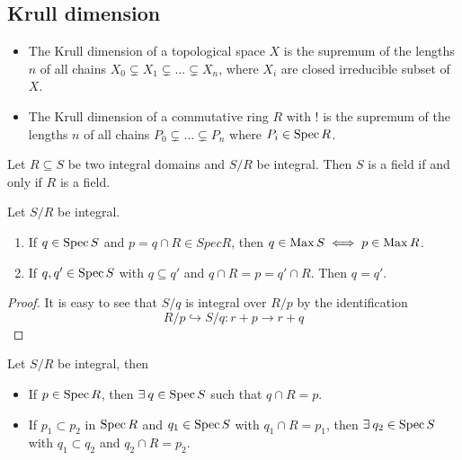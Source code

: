 \subsection{Krull dimension}
\begin{definition} \hfill
  \begin{itemize}
    \item 
      The Krull dimension of a topological space $X$ is the supremum of the lengths $n$ of
      all chains $X_0 \subsetneq X_1 \subsetneq \dots \subsetneq X_n$, where $X_i$ are closed irreducible subset of $X$.
    \item
      The Krull dimension of a commutative ring $R$ with $!$ is the
      supremum of the lengths $n$ of all chains $P_0 \subsetneq \dots \subsetneq P_n$ where $P_i \in \operatorname{Spec} R$.
  \end{itemize}
\end{definition}

\begin{prop}
  Let $R \subseteq S$ be two integral domains and $S/R$ be integral. Then $S$ is a field if and only if $R$ is a field.
\end{prop}

\begin{prop}
  Let $S/R$ be integral.
  \begin{enumerate}
    \item If $q \in \operatorname{Spec} S$ and $p = q \cap R \in Spec R$, then
      $q \in \operatorname{Max} S \iff p \in \operatorname{Max} R$.
    \item If $q, q' \in \operatorname{Spec} S$ with $q \subseteq q'$ and $q \cap R = p = q' \cap R$.
      Then $q = q'$.
  \end{enumerate}

  \begin{proof}
    It is easy to see that $S/q$ is integral over $R/p$ by the identification
    \[ R/p \hookrightarrow S/q : r+p \to r+q\]
  \end{proof}
\end{prop}

\begin{theorem}
  Let $S/R$ be integral, then
  \begin{itemize}
    \item If $p \in \operatorname{Spec} R$, then $\exists q \in \Spec S$ such that $q \cap R = p$.
    \item If $p_1 \subset p_2$ in $\operatorname{Spec} R$ and $q_1 \in \operatorname{Spec} S$ with $q_1 \cap R = p_1$,
      then $\exists q_2 \in \Spec S$ with $q_1 \subset q_2$ and $q_2 \cap R = p_2$.
  \end{itemize}
\end{theorem}

